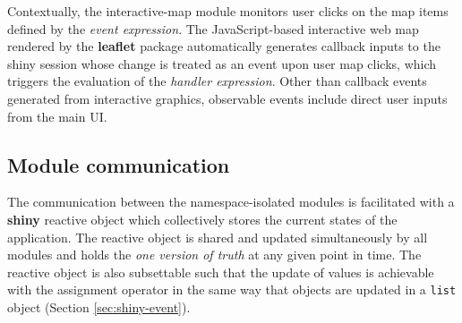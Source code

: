 \documentclass{aucklandthesis}
\begin{document}
\begin{Shaded}
\begin{Highlighting}[]
\StringTok{ }
\StringTok{ }
    \NormalTok{(input[[}\NormalTok{]], \{}
\NormalTok{      state[[}\NormalTok{]] <-}\StringTok{ }\NormalTok{input[[}\NormalTok{]][[}\NormalTok{]]}
\NormalTok{    \})}
\NormalTok{  \}}
\NormalTok{\}}
\end{Highlighting}
\end{Shaded}

Contextually, the interactive-map module monitors user clicks on the map items defined by the \emph{event expression}. The JavaScript-based interactive web map rendered by the \textbf{leaflet} package \autocite{leaflet} automatically generates callback inputs to the shiny session whose change is treated as an event upon user map clicks, which triggers the evaluation of the \emph{handler expression}. Other than callback events generated from interactive graphics, observable events include direct user inputs from the main UI.

\hypertarget{module-communication}{%
\subsection{Module communication}\label{module-communication}}

The communication between the namespace-isolated modules is facilitated with a \textbf{shiny} reactive object which collectively stores the current states of the application. The reactive object is shared and updated simultaneously by all modules and holds the \emph{one version of truth} at any given point in time. The reactive object is also subsettable such that the update of values is achievable with the assignment operator in the same way that objects are updated in a \texttt{list} object (Section \ref{sec:shiny-event}).

\begin{Shaded}
\begin{Highlighting}[]
\StringTok{ }
\StringTok{ }
\NormalTok{  \}}
\NormalTok{\}}
\end{Highlighting}
\end{Shaded}
\end{document}
